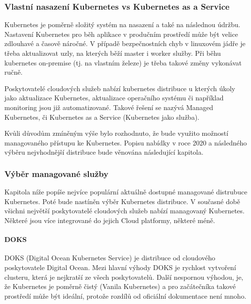 \documentclass[thesis=M,czech]{FITthesis}[2019/12/23]
\theoremstyle{plain}
\theoremstyle{definition}
\begin{document}





\subsubsection{Vlastní nasazení Kubernetes vs Kubernetes as a Service}

Kubernetes je poměrně složitý systém na nasazení a také na následnou údržbu. Nastavení Kubernetes pro běh aplikace v produčním prostředí může být velice zdlouhavé a časově náročné. V případě bezpečnostních chyb v linuxovém jádře je třeba aktualizovat uzly, na kterých běží master i worker služby. Při běhu kubernetes on-premise (tj. na vlastním železe) je třeba takové změny vykonávat ručně.

Poskytovatelé cloudových služeb nabízí kubernetes distribuce u kterých úkoly jako aktualizace Kubernetes, aktualizace operačního systému či například monitoring jsou již automatizované. Takové řešení se nazývá Managed Kubernetes, či Kubernetes as a Service (Kubernetes jako služba). 

Kvůli důvodům zmíněným výše bylo rozhodnuto, že bude využito možností managovaného přístupu ke Kubernetes. Popisu nabídky v roce 2020 a následného výběru nejvhodnější distribuce bude věnována následující kapitola.


\subsubsection{Výběr managované služby}


Kapitola níže popíše nejvíce populární aktuálně dostupné managované distrubuce Kubernetes. Poté bude nastíněn výběr Kubernetes distribuce. V současné době všichni největší poskytovatelé cloudových služeb nabízí managovaný Kubernetes. Některé jsou více integrované do jejich Cloud platformy, některé méně. 

\paragraph{DOKS}

DOKS (Digital Ocean Kubernetes Service)\cite{doks} je distribuce od cloudového poskytovatele Digital Ocean. Mezi hlavní výhody DOKS je rychlost vytvoření clusteru, která je nejkratší ze všech poskytovatelů. Další nespornou výhodou, je, že Kubernetes je poměrně čistý (Vanila Kubernetes) a pro začátečníka takové prostředí může být ideální, protože rozdílů od oficiální dokumentace není mnoho. 
\end{document}
